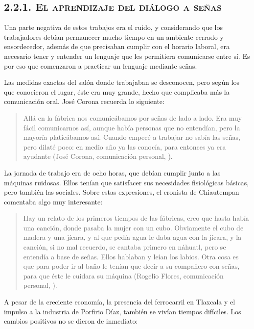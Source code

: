 \documentclass[14pt,letterpaper,twoside]{extbook} %
\begin{document}
\subsection*{\mdseries\large\textsc{2.2.1. El aprendizaje del diálogo a señas}}

\noindent Una parte negativa de estos trabajos era el ruido, y considerando que los trabajadores debían permanecer mucho tiempo en un ambiente cerrado y ensordecedor, además de que precisaban cumplir con el horario laboral, era necesario tener y entender un lenguaje que les permitiera comunicarse entre sí. Es por eso que comenzaron a practicar un lenguaje mediante señas.

Las medidas exactas del salón donde trabajaban se desconocen, pero según los que conocieron el lugar, éste era muy grande, hecho que complicaba más la comunicación oral. José Corona recuerda lo siguiente:

\begin{quotation}
\noindent Allá en la fábrica nos comunicábamos por señas de lado a lado. Era muy fácil comunicarnos así, aunque había personas que no entendían, pero la mayoría platicábamos así. Cuando empecé a trabajar no sabía las señas, pero dilaté poco: en medio año ya las conocía, para entonces ya era ayudante (José Corona, comunicación personal, ).
\end{quotation}

\noindent La jornada de trabajo era de ocho horas, que debían cumplir junto a las máquinas ruidosas. Ellos tenían que satisfacer sus necesidades fisiológicas básicas, pero también las sociales. Sobre estas expresiones, el cronista de Chiautempan comentaba algo muy interesante:

\begin{quotation}
\noindent Hay un relato de los primeros tiempos de las fábricas, creo que hasta había una canción, donde pasaba la mujer con un cubo. Obviamente el cubo de madera y una jícara, y al que pedía agua le daba agua con la jícara, y la canción, si no mal recuerdo, se cantaba primero en náhuatl, pero se entendía a base de señas. Ellos hablaban y leían los labios. Otra cosa es que para poder ir al baño le tenían que decir a su compañero con señas, para que éste le cuidara su máquina (Rogelio Flores, comunicación personal, ).
\end{quotation}

\noindent A pesar de la creciente economía, la presencia del ferrocarril en Tlaxcala y el impulso a la industria de Porfirio Díaz, también se vivían tiempos difíciles. Los cambios positivos no se dieron de inmediato:
\end{document}
